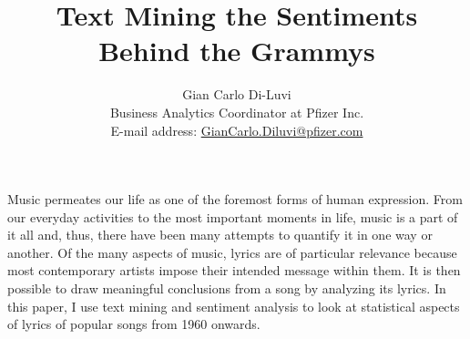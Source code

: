 \documentclass{article}
\begin{document}
\title{\vspace{-1.2cm}Text Mining the Sentiments Behind the Grammys}
\author{Gian Carlo Di-Luvi \\
{\normalsize Business Analytics Coordinator at Pfizer Inc.} \\
{\normalsize E-mail address: \href{mailto:giancarlo.diluvi@pfizer.com}{GianCarlo.Diluvi@pfizer.com}}}
\date{}

\maketitle


Music permeates our life as one of the foremost forms of human expression. From our everyday activities to the most important moments in life, music is a part of it all and, thus, there have been many attempts to quantify it in one way or another. Of the many aspects of music, lyrics are of particular relevance because most contemporary artists impose their intended message within them. It is then possible to draw meaningful conclusions from a song by analyzing its lyrics. In this paper, I use text mining and sentiment analysis to look at statistical aspects of lyrics of popular songs from 1960 onwards.






\end{document}
